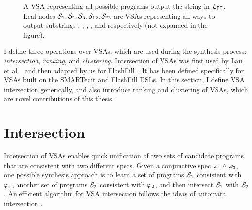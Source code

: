 \begin{figure}[t]
    \centering
    \begin{dot2tex}[options=--usepdflatex --figonly]
        
    \end{dot2tex}
    \caption{A VSA representing all possible programs output the string  in $\ffdsl$.
    Leaf nodes $\vsa_1, \vsa_2, \vsa_3, \vsa_{12}, \vsa_{23}$ are VSAs representing all ways to output substrings
    , , , , and  respectively
    (not expanded in the figure).}
    \label{fig:ex:vsa}
\end{figure}

I define three operations over VSAs, which are used during the synthesis process: \emph{intersection},
\emph{ranking}, and \emph{clustering}.
Intersection of VSAs was first used by Lau et al.~\cite{lau:smartedit} and then adapted by us for FlashFill~\cite{flashfill}.
It has been defined specifically for VSAs built on the SMARTedit and FlashFill DSLs.
In this section, I define VSA intersection generically, and also introduce ranking and clustering of VSAs, which are
novel contributions of this thesis.

\section{Intersection}
Intersection of VSAs enables quick unification of two sets of candidate programs that are consistent with two different
specs.
Given a conjunctive spec $\spec_1 \wedge \spec_2$, one possible synthesis approach is to learn a set of programs
$\vsa_1$ consistent with
$\spec_1$, another set of programs $\vsa_2$ consistent with $\spec_2$, and then intersect $\vsa_1$ with $\vsa_2$.
An efficient algorithm for VSA intersection follows the ideas of automata intersection \cite{hopcroft1979introduction}.

